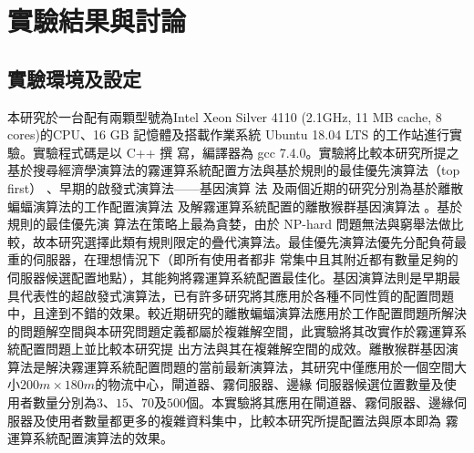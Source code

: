 \chapter{實驗結果與討論}
\label{chapter:exp}
\section{實驗環境及設定}
本研究於一台配有兩顆型號為Intel Xeon Silver 4110 (2.1GHz, 11 MB cache, 8 cores)的CPU、16 GB 記憶體及搭載作業系統 Ubuntu 18.04 LTS 的工作站進行實驗。實驗程式碼是以 C++ 撰
寫，編譯器為 gcc 7.4.0。實驗將比較本研究所提之基於搜尋經濟學演算法的霧運算系統配置方法與基於規則的最佳優先演算法（top first） \cite{li_2018}、早期的啟發式演算法——基因演算
法 \cite{holland_1962}及兩個近期的研究分別為基於離散蝙蝠演算法的工作配置演算法 \cite{mishra_2018}及解霧運算系統配置的離散猴群基因演算法 \cite{lin_2018}。基於規則的最佳優先演
算法在策略上最為貪婪，由於 NP-hard 問題無法與窮舉法做比較，故本研究選擇此類有規則限定的疊代演算法。最佳優先演算法優先分配負荷最重的伺服器，在理想情況下（即所有使用者都非
常集中且其附近都有數量足夠的伺服器候選配置地點），其能夠將霧運算系統配置最佳化。基因演算法則是早期最具代表性的超啟發式演算法，已有許多研究將其應用於各種不同性質的配置問題
中，且達到不錯的效果。較近期研究的離散蝙蝠演算法應用於工作配置問題所解決的問題解空間與本研究問題定義都屬於複雜解空間，此實驗將其改實作於霧運算系統配置問題上並比較本研究提
出方法與其在複雜解空間的成效。離散猴群基因演算法是解決霧運算系統配置問題的當前最新演算法，其研究中僅應用於一個空間大小$200m \times 180m$的物流中心，閘道器、霧伺服器、邊緣
伺服器候選位置數量及使用者數量分別為$3$、$15$、$70$及$500$個。本實驗將其應用在閘道器、霧伺服器、邊緣伺服器及使用者數量都更多的複雜資料集中，比較本研究所提配置法與原本即為
霧運算系統配置演算法的效果。